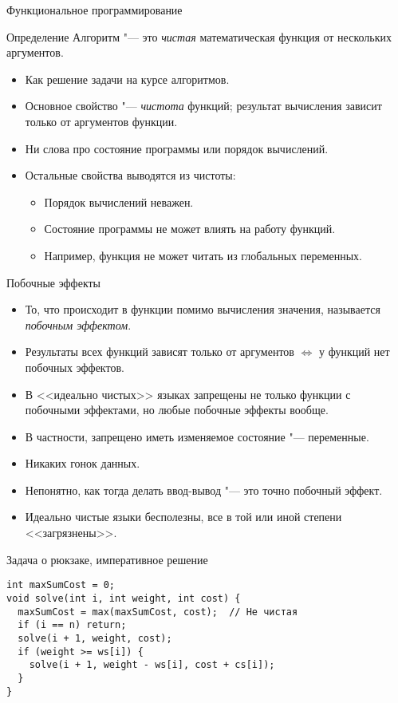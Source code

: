\begin{frame}{Функциональное программирование}
	\begin{exampleblock}{Определение}
		Алгоритм "--- это \textit{чистая} математическая функция от нескольких аргументов.
	\end{exampleblock}
	\begin{itemize}
		\item Как решение задачи на курсе алгоритмов.
		\item Основное свойство "--- \textit{чистота} функций; результат вычисления зависит только от аргументов функции.
		\item Ни слова про состояние программы или порядок вычислений.
		\item Остальные свойства выводятся из чистоты:
			\begin{itemize}
				\item Порядок вычислений неважен.
				\item Состояние программы не может влиять на работу функций.
				\item Например, функция не может читать из глобальных переменных.
			\end{itemize}
	\end{itemize}
\end{frame}

\begin{frame}{Побочные эффекты}
	\begin{itemize}
		\item То, что происходит в функции помимо вычисления значения, называется \textit{побочным эффектом}.
		\item Результаты всех функций зависят только от аргументов $\iff$ у функций нет побочных эффектов.
		\item В <<идеально чистых>> языках запрещены не только функции с побочными эффектами, но любые побочные эффекты вообще.
		\item В частности, запрещено иметь изменяемое состояние "--- переменные.
		\item Никаких гонок данных.
		\item Непонятно, как тогда делать ввод-вывод "--- это точно побочный эффект.
		\item Идеально чистые языки бесполезны, все в той или иной степени <<загрязнены>>.
	\end{itemize}
\end{frame}

\begin{frame}[fragile]{Задача о рюкзаке, императивное решение}
\begin{verbatim}
int maxSumCost = 0;
void solve(int i, int weight, int cost) {
  maxSumCost = max(maxSumCost, cost);  // Не чистая
  if (i == n) return;
  solve(i + 1, weight, cost);
  if (weight >= ws[i]) {
    solve(i + 1, weight - ws[i], cost + cs[i]);
  }
}
\end{verbatim}
\end{frame}

